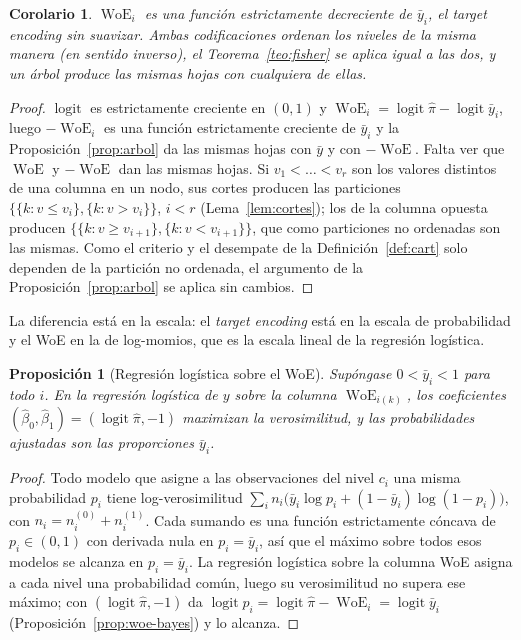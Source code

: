 \documentclass[11pt,a4paper]{article}
\theoremstyle{plain}
\newtheorem{proposicion}[teorema]{Proposición}
\newtheorem{corolario}[teorema]{Corolario}
\theoremstyle{definition}
\theoremstyle{remark}
\newcommand{\logit}{\operatorname{logit}}
\newcommand{\WoE}{\operatorname{WoE}}
\newcommand{\1}{\mathbf{1}}
\begin{document}
\begin{corolario}\label{cor:woe-te}
$\WoE_i$ es una función estrictamente decreciente de $\bar y_i$, el
\emph{target encoding} sin suavizar. Ambas codificaciones ordenan los
niveles de la misma manera (en sentido inverso), el
Teorema~\ref{teo:fisher} se aplica igual a las dos, y un árbol produce las
mismas hojas con cualquiera de ellas.
\end{corolario}

\begin{proof}
$\logit$ es estrictamente creciente en $(0,1)$ y
$\WoE_i=\logit\hat\pi-\logit\bar y_i$, luego $-\WoE_i$ es una función
estrictamente creciente de $\bar y_i$ y la Proposición~\ref{prop:arbol} da
las mismas hojas con $\bar y$ y con $-\WoE$. Falta ver que $\WoE$ y
$-\WoE$ dan las mismas hojas. Si $v_1<\dots<v_r$ son los valores distintos
de una columna en un nodo, sus cortes producen las particiones
$\{\{k:v\le v_i\},\{k:v>v_i\}\}$, $i<r$ (Lema~\ref{lem:cortes}); los
de la columna opuesta producen $\{\{k:v\ge v_{i+1}\},\{k:v<v_{i+1}\}\}$,
que como particiones no ordenadas son las mismas. Como el criterio y el
desempate de la Definición~\ref{def:cart} solo dependen de la partición no
ordenada, el argumento de la Proposición~\ref{prop:arbol} se aplica
sin cambios.
\end{proof}

La diferencia está en la escala: el \emph{target encoding} está en la
escala de probabilidad y el WoE en la de log-momios, que es la escala
lineal de la regresión logística.

\begin{proposicion}[Regresión logística sobre el WoE]\label{prop:woe-logit}
Supóngase $0<\bar y_i<1$ para todo $i$. En la regresión logística de $y$
sobre la columna $\WoE_{i(k)}$, los coeficientes
$(\hat\beta_0,\hat\beta_1)=(\logit\hat\pi,-1)$ maximizan la verosimilitud,
y las probabilidades ajustadas son las proporciones $\bar y_i$.
\end{proposicion}

\begin{proof}
Todo modelo que asigne a las observaciones del nivel $c_i$ una misma
probabilidad $p_i$ tiene log-verosimilitud
$\sum_in_i\bigl(\bar y_i\log p_i+(1-\bar y_i)\log(1-p_i)\bigr)$, con
$n_i=n_i^{(0)}+n_i^{(1)}$. Cada sumando es una función estrictamente cóncava
de $p_i\in(0,1)$ con derivada nula en $p_i=\bar y_i$, así que el máximo
sobre todos esos modelos se alcanza en $p_i=\bar y_i$. La regresión
logística sobre la columna WoE asigna a cada nivel una probabilidad común,
luego su verosimilitud no supera ese máximo; con
$(\logit\hat\pi,-1)$ da $\logit p_i=\logit\hat\pi-\WoE_i=\logit\bar y_i$
(Proposición~\ref{prop:woe-bayes}) y lo alcanza.
\end{proof}
\end{document}
